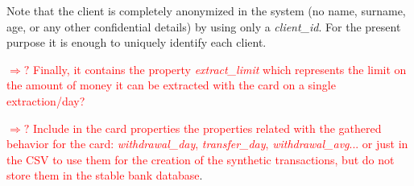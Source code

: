 \documentclass{article}
\begin{document}
Note that the client is completely anonymized in the system (no name, surname, age, or any other confidential details) by using only a \emph{client\_id}. For the present purpose it is enough to uniquely identify each client.

\textcolor{red}{$\Rightarrow ?$ Finally, it contains the property \emph{extract\_limit}
which represents the limit on the amount of money it can be extracted with the card on a single 
extraction/day?}

\textcolor{red}{$\Rightarrow ?$ Include in the card properties the properties related with the
gathered behavior for the card: \emph{withdrawal\_day}, \emph{transfer\_day}, 
\emph{withdrawal\_avg}... or just in the CSV to use them for the creation of the synthetic
transactions, but do not store them in the stable bank database}.
\end{document}

